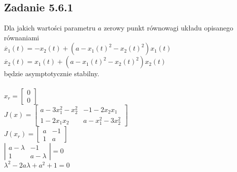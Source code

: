 \subsection*{Zadanie 5.6.1} {\color{darkgray}
	Dla jakich wartości parametru $a$ zerowy punkt równowagi układu opisanego równaniami\\
	$\dot{x_1}(t)=-x_2(t)+(a-x_1(t)^2-x_2(t)^2)x_1(t)$\\
	$\dot{x_2}(t)=x_1(t)+(a-x_1(t)^2-x_2(t)^2)x_2(t)$\\
	będzie asymptotycznie stabilny.
}\\\\
$x_r=\left[ \begin{array}{c}     0\\0   \end{array}\right]$\\
$J(x)=\left[ \begin{array}{cc}   a-3x_1^2-x_2^2 & -1-2x_2x_1 \\ 1-2x_1x_2 & a-x_1^2-3x_2^2    \end{array}\right]$\\
$J(x_r)=\left[ \begin{array}{cc}    a & -1 \\ 1 & a    \end{array}\right]$\\
$\left| \begin{array}{cc}     a-\lambda & -1 \\ 1 & a-\lambda   \end{array}\right|=0$\\
$\lambda^2-2a\lambda+a^2+1=0$\\
\\\\\\
